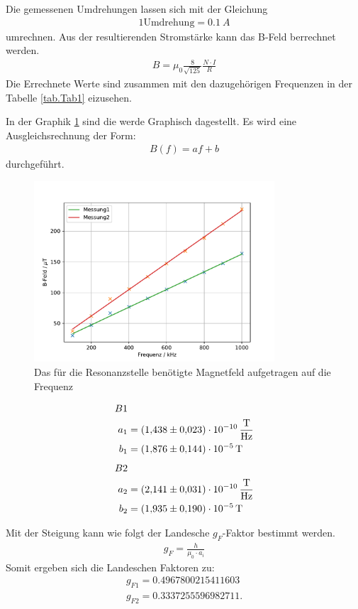 Die gemessenen Umdrehungen lassen sich mit der Gleichung
\begin{align*}
  1 \text{Umdrehung} = \SI{0,1}{A}
\end{align*}
umrechnen. Aus der resultierenden Stromstärke kann das B-Feld berrechnet werden.
\begin{align*}
  B=\mu_0\frac{8}{\sqrt{125}}\frac{N\cdot I}{R}
\end{align*}
Die Errechnete Werte sind zusammen mit den dazugehörigen Frequenzen in der Tabelle \ref{tab.Tab1} eizusehen.

\FloatBarrier
In der Graphik \ref{fig:Bf} sind die werde Graphisch dagestellt.
Es wird eine Ausgleichsrechnung der Form:
\begin{align*}
  B(f)=af+b
\end{align*}
durchgeführt.
\begin{figure}[h!]
  \centering
  \includegraphics[width=0.8\textwidth]{B-Feld.pdf}
  \caption{Das für die Resonanzstelle benötigte Magnetfeld aufgetragen auf die Frequenz}
  \label{fig:Bf}
\end{figure}
\begin{align*}
  B1&\\
  a_1&=\SI{1.438\pm 0.023e-10}{\frac{T}{Hz}}\\
  b_1&=\SI{1.876\pm 0.144e-5}{T}
\end{align*}
\begin{align*}
  B2&\\
  a_2&=\SI{2.141\pm0.031e-10}{\frac{T}{Hz}}\\
  b_2&=\SI{1.935\pm0.190e-5}{T}
\end{align*}

Mit der Steigung kann wie folgt der Landesche $g_F$-Faktor bestimmt werden.
\begin{align*}
  g_F = \frac{h}{\mu_0\cdot a_i}
\end{align*}
Somit ergeben sich die Landeschen Faktoren zu:
\begin{align*}
  g_{F1} = 0.4967800215411603\\
  g_{F2} = 0.3337255596982711.
\end{align*}

